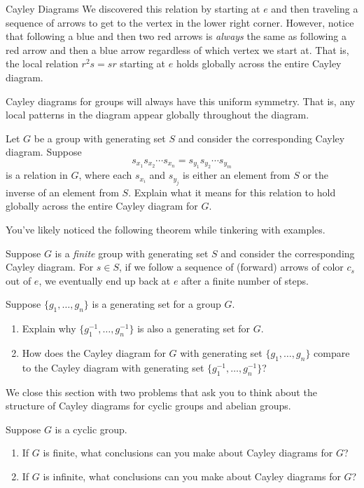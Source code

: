 \begin{section}{Cayley Diagrams}
We discovered this relation by starting at $e$ and then traveling a sequence of arrows to get to the vertex in the lower right corner.  However, notice that following a blue and then two red arrows is \emph{always} the same as following a red arrow and then a blue arrow regardless of which vertex we start at.  That is, the local relation $r^2s=sr$ starting at $e$ holds globally across the entire Cayley diagram.

Cayley diagrams for groups will always have this uniform symmetry. That is, any local patterns in the diagram appear globally throughout the diagram. 

\begin{problem}
Let $G$ be a group with generating set $S$ and consider the corresponding Cayley diagram. Suppose
\[
s_{x_1}s_{x_2}\cdots s_{x_n}=s_{y_1}s_{y_2}\cdots s_{y_m}
\]
is a relation in $G$, where each $s_{x_i}$ and $s_{y_j}$ is either an element from $S$ or the inverse of an element from $S$.  Explain what it means for this relation to hold globally across the entire Cayley diagram for $G$.
\end{problem}

You've likely noticed the following theorem while tinkering with examples.

\begin{theorem}
Suppose $G$ is a \emph{finite} group with generating set $S$ and consider the corresponding Cayley diagram. For $s\in S$, if we follow a sequence of (forward) arrows of color $c_s$ out of $e$, we eventually end up back at $e$ after a finite number of steps.
\end{theorem}

\begin{problem}
Suppose $\{g_1,\ldots,g_n\}$ is a generating set for a group $G$.
\begin{enumerate}[label=\rm{(\alph*)}]
\item Explain why $\{g^{-1}_1,\ldots,g^{-1}_n\}$ is also a generating set for $G$.
\item How does the Cayley diagram for $G$ with generating set $\{g_1,\ldots,g_n\}$ compare to the Cayley diagram with generating set $\{g^{-1}_1,\ldots,g^{-1}_n\}$?
\end{enumerate}
\end{problem}

We close this section with two problems that ask you to think about the structure of Cayley diagrams for cyclic groups and abelian groups.

\begin{problem}
Suppose $G$ is a cyclic group. 
\begin{enumerate}[label=\rm{(\alph*)}]
\item If $G$ is finite, what conclusions can you make about Cayley diagrams for $G$?
\item If $G$ is infinite, what conclusions can you make about Cayley diagrams for $G$?
\end{enumerate}
\end{problem}


\end{section}
